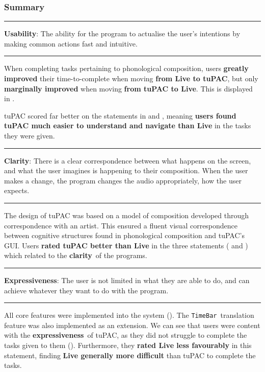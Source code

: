 \documentclass[12pt,a4paper,oneside,openright]{report}
\newcommand{\timebar}{\texttt{TimeBar}}
\newcommand{\clarity}{\textbf{clarity}}
\newcommand{\expressiveness}{\textbf{expressiveness}}
\newcommand{\Usability}{\textbf{Usability}}
\newcommand{\Clarity}{\textbf{Clarity}}
\newcommand{\Expressiveness}{\textbf{Expressiveness}}
\newcommand{\statement}[1]{\vspace{1em}
\hrule
\begin{center}
#1
\end{center}
\vspace{1em}
\hrule}
\begin{document}
\clearpage
\subsubsection{Summary}
\statement{\Usability: The ability for the program to actualise the user's intentions by making common actions fast and intuitive.}

When completing tasks pertaining to phonological composition, users \textbf{greatly improved} their time-to-complete when moving \textbf{from Live to tuPAC}, but only \textbf{marginally improved} when moving \textbf{from tuPAC to Live}. This is displayed in .

tuPAC scored far better on the statements in  and , meaning \textbf{users found tuPAC much easier to understand and navigate than Live} in the tasks they were given.

\statement{\Clarity: There is a clear correspondence between what happens on the screen, and
what the user imagines is happening to their composition. When the user makes a
change, the program changes the audio appropriately, how the user expects.}

The design of tuPAC was based on a model of composition developed through correspondence with an artist. This ensured a fluent visual correspondence between cognitive structures found in phonological composition and tuPAC's GUI. Users \textbf{rated tuPAC better than Live} in the three statements ( and ) which related to the \clarity\ of the programs.

\statement{\Expressiveness: The user is not limited in what they are able to do, and can achieve whatever they want to do with the program.}
All core features were implemented into the system (). The \timebar\ translation feature was also implemented as an extension. We can see that users were content with the \expressiveness\ of tuPAC, as they did not struggle to complete the tasks given to them (). Furthermore, they \textbf{rated Live less favourably} in this statement, finding \textbf{Live generally more difficult} than tuPAC to complete the tasks.
\end{document}
